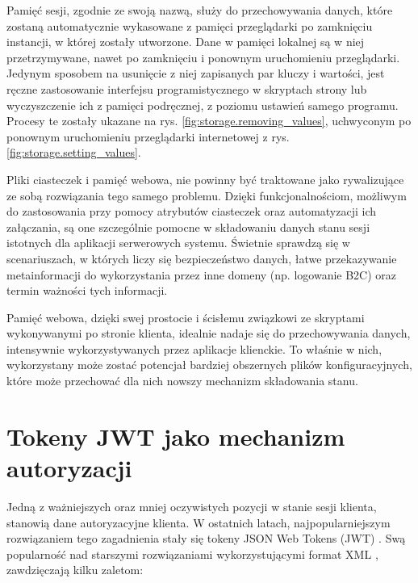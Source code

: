 Pamięć sesji, zgodnie ze swoją nazwą, służy do przechowywania danych, które zostaną automatycznie wykasowane z pamięci przeglądarki po zamknięciu instancji, w której zostały utworzone. Dane w pamięci lokalnej są w niej przetrzymywane, nawet po zamknięciu i ponownym uruchomieniu przeglądarki. Jedynym sposobem na usunięcie z niej zapisanych par kluczy i wartości, jest ręczne zastosowanie interfejsu programistycznego w skryptach strony lub wyczyszczenie ich z pamięci podręcznej, z poziomu ustawień samego programu. Procesy te zostały ukazane na rys. \ref{fig:storage.removing_values}, uchwyconym po ponownym uruchomieniu przeglądarki internetowej z rys. \ref{fig:storage.setting_values}.

Pliki ciasteczek i pamięć webowa, nie powinny być traktowane jako rywalizujące ze sobą rozwiązania tego samego problemu. Dzięki funkcjonalnościom, możliwym do zastosowania przy pomocy atrybutów ciasteczek oraz automatyzacji ich załączania, są one szczególnie pomocne w składowaniu danych stanu sesji istotnych dla aplikacji serwerowych systemu. Świetnie sprawdzą się w scenariuszach, w których liczy się bezpieczeństwo danych, łatwe przekazywanie metainformacji do wykorzystania przez inne domeny (np. logowanie B2C) oraz termin ważności tych informacji. 

Pamięć webowa, dzięki swej prostocie i ścisłemu związkowi ze skryptami wykonywanymi po stronie klienta, idealnie nadaje się do przechowywania danych, intensywnie wykorzystywanych przez aplikacje klienckie. To właśnie w nich, wykorzystany może zostać potencjał bardziej obszernych plików konfiguracyjnych, które może przechować dla nich nowszy mechanizm składowania stanu.

\section{Tokeny JWT jako mechanizm autoryzacji}

Jedną z ważniejszych oraz mniej oczywistych pozycji w stanie sesji klienta, stanowią dane autoryzacyjne klienta. W ostatnich latach, najpopularniejszym rozwiązaniem tego zagadnienia stały się tokeny JSON Web Tokens (JWT) \cite{jwt.rfc7519}. Swą popularność nad starszymi rozwiązaniami wykorzystującymi format XML \cite{jwt.auth0}, zawdzięczają kilku zaletom:

